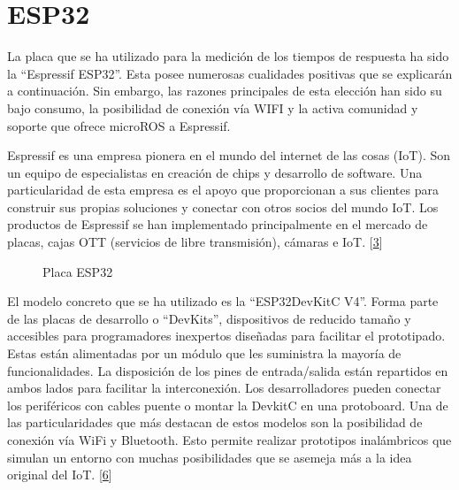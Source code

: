 \documentclass[a4paper,11pt,spanish]{sphinxmanual}
\let\sphinxpxdimen\pdfpxdimen\else\newdimen\sphinxpxdimen
\begin{document}
\section{ESP\sphinxhyphen{}32}
\label{\detokenize{hardware:esp-32}}
\sphinxAtStartPar
La placa que se ha utilizado para la medición de los tiempos de
respuesta ha sido la “Espressif ESP32”. Esta posee numerosas cualidades
positivas que se explicarán a continuación. Sin embargo, las razones
principales de esta elección han sido su bajo consumo, la posibilidad
de conexión vía WIFI y la activa comunidad y soporte que ofrece micro\sphinxhyphen{}ROS
a Espressif.

\sphinxAtStartPar
Espressif es una empresa pionera en el mundo del internet de las
cosas (IoT). Son un equipo de especialistas en creación de chips y desarrollo
de software. Una particularidad de esta empresa es el apoyo que proporcionan
a sus clientes para construir sus propias soluciones y conectar con otros
socios del mundo IoT. Los productos de Espressif se han implementado
principalmente en el mercado de placas, cajas OTT
(servicios de libre transmisión), cámaras e IoT. {[}\hyperlink{cite.marco_teorico_y_estado_del_arte:id31}{3}{]}

\begin{figure}[htbp]
\centering
\capstart

\noindent\sphinxincludegraphics[width=300\sphinxpxdimen]{{esp32}.jpg}
\caption{Placa ESP32}\label{\detokenize{hardware:id5}}\end{figure}

\sphinxAtStartPar
El modelo concreto que se ha utilizado es la “ESP32\sphinxhyphen{}DevKitC V4”.
Forma parte de las placas de desarrollo o “DevKits”, dispositivos de
reducido tamaño y accesibles para programadores inexpertos diseñadas para
facilitar el prototipado. Estas están alimentadas por un módulo que les
suministra la mayoría de funcionalidades. La disposición de los pines de
entrada/salida están repartidos en ambos lados para facilitar la interconexión.
Los desarrolladores pueden conectar los periféricos con cables puente
o montar la DevkitC en una protoboard. Una de las particularidades que
más destacan de estos modelos son la posibilidad de conexión vía Wi\sphinxhyphen{}Fi
y Bluetooth. Esto permite realizar prototipos inalámbricos que simulan
un entorno con muchas posibilidades que se asemeja más a la idea original
del IoT. {[}\hyperlink{cite.marco_teorico_y_estado_del_arte:id32}{6}{]}
\end{document}
